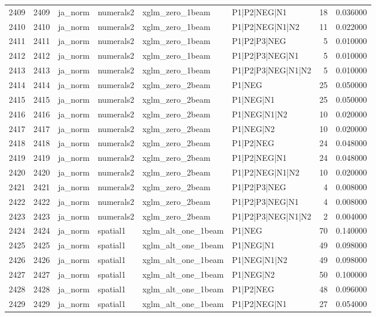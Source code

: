 \begin{tabular}{lrllllrr}
2409 & 2409 & ja_norm & numerals2 & xglm_zero_1beam & P1|P2|NEG|N1 & 18 & 0.036000 \\
2410 & 2410 & ja_norm & numerals2 & xglm_zero_1beam & P1|P2|NEG|N1|N2 & 11 & 0.022000 \\
2411 & 2411 & ja_norm & numerals2 & xglm_zero_1beam & P1|P2|P3|NEG & 5 & 0.010000 \\
2412 & 2412 & ja_norm & numerals2 & xglm_zero_1beam & P1|P2|P3|NEG|N1 & 5 & 0.010000 \\
2413 & 2413 & ja_norm & numerals2 & xglm_zero_1beam & P1|P2|P3|NEG|N1|N2 & 5 & 0.010000 \\
2414 & 2414 & ja_norm & numerals2 & xglm_zero_2beam & P1|NEG & 25 & 0.050000 \\
2415 & 2415 & ja_norm & numerals2 & xglm_zero_2beam & P1|NEG|N1 & 25 & 0.050000 \\
2416 & 2416 & ja_norm & numerals2 & xglm_zero_2beam & P1|NEG|N1|N2 & 10 & 0.020000 \\
2417 & 2417 & ja_norm & numerals2 & xglm_zero_2beam & P1|NEG|N2 & 10 & 0.020000 \\
2418 & 2418 & ja_norm & numerals2 & xglm_zero_2beam & P1|P2|NEG & 24 & 0.048000 \\
2419 & 2419 & ja_norm & numerals2 & xglm_zero_2beam & P1|P2|NEG|N1 & 24 & 0.048000 \\
2420 & 2420 & ja_norm & numerals2 & xglm_zero_2beam & P1|P2|NEG|N1|N2 & 10 & 0.020000 \\
2421 & 2421 & ja_norm & numerals2 & xglm_zero_2beam & P1|P2|P3|NEG & 4 & 0.008000 \\
2422 & 2422 & ja_norm & numerals2 & xglm_zero_2beam & P1|P2|P3|NEG|N1 & 4 & 0.008000 \\
2423 & 2423 & ja_norm & numerals2 & xglm_zero_2beam & P1|P2|P3|NEG|N1|N2 & 2 & 0.004000 \\
2424 & 2424 & ja_norm & spatial1 & xglm_alt_one_1beam & P1|NEG & 70 & 0.140000 \\
2425 & 2425 & ja_norm & spatial1 & xglm_alt_one_1beam & P1|NEG|N1 & 49 & 0.098000 \\
2426 & 2426 & ja_norm & spatial1 & xglm_alt_one_1beam & P1|NEG|N1|N2 & 49 & 0.098000 \\
2427 & 2427 & ja_norm & spatial1 & xglm_alt_one_1beam & P1|NEG|N2 & 50 & 0.100000 \\
2428 & 2428 & ja_norm & spatial1 & xglm_alt_one_1beam & P1|P2|NEG & 48 & 0.096000 \\
2429 & 2429 & ja_norm & spatial1 & xglm_alt_one_1beam & P1|P2|NEG|N1 & 27 & 0.054000 \\

\end{tabular}
